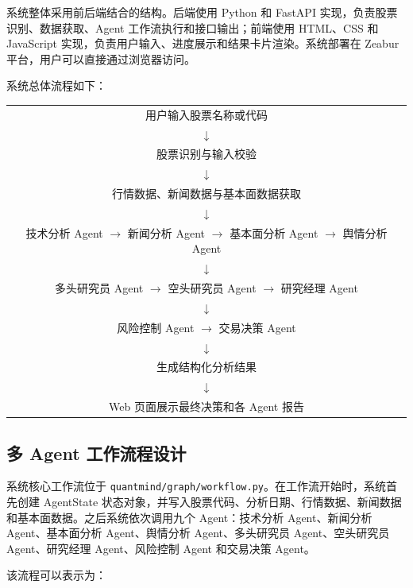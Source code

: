 \documentclass[UTF8,a4paper,12pt]{ctexart}
\begin{document}
系统整体采用前后端结合的结构。后端使用 Python 和 FastAPI 实现，负责股票识别、数据获取、Agent 工作流执行和接口输出；前端使用 HTML、CSS 和 JavaScript 实现，负责用户输入、进度展示和结果卡片渲染。系统部署在 Zeabur 平台，用户可以直接通过浏览器访问。

系统总体流程如下：

\begin{center}
\begin{tabular}{c}
用户输入股票名称或代码 \\
$\downarrow$ \\
股票识别与输入校验 \\
$\downarrow$ \\
行情数据、新闻数据与基本面数据获取 \\
$\downarrow$ \\
技术分析 Agent $\rightarrow$ 新闻分析 Agent $\rightarrow$ 基本面分析 Agent $\rightarrow$ 舆情分析 Agent \\
$\downarrow$ \\
多头研究员 Agent $\rightarrow$ 空头研究员 Agent $\rightarrow$ 研究经理 Agent \\
$\downarrow$ \\
风险控制 Agent $\rightarrow$ 交易决策 Agent \\
$\downarrow$ \\
生成结构化分析结果 \\
$\downarrow$ \\
Web 页面展示最终决策和各 Agent 报告
\end{tabular}
\end{center}

\subsection{多 Agent 工作流程设计}

系统核心工作流位于 \texttt{quantmind/graph/workflow.py}。在工作流开始时，系统首先创建 AgentState 状态对象，并写入股票代码、分析日期、行情数据、新闻数据和基本面数据。之后系统依次调用九个 Agent：技术分析 Agent、新闻分析 Agent、基本面分析 Agent、舆情分析 Agent、多头研究员 Agent、空头研究员 Agent、研究经理 Agent、风险控制 Agent 和交易决策 Agent。

该流程可以表示为：
\end{document}
